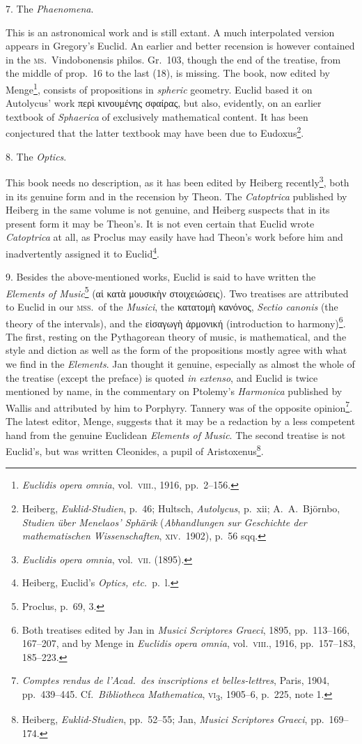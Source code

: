 7. The \emph{Phaenomena}.

This is an astronomical work and is still extant. A much interpolated version appears in Gregory's Euclid. An earlier and better recension is however contained in the \textsc{ms.}\ Vindobonensis philos. Gr.~103, though the end of the treatise, from the middle of prop.~16 to the last (18), is missing. The book, now edited by Menge\footnote{\emph{Euclidis opera omnia}, vol.~\textsc{viii}., 1916, pp.~2--156.}, consists of propositions in \emph{spheric} geometry. Euclid based it on Autolycus' work περὶ κινουμένης σφαίρας, but also, evidently, on an earlier textbook of \emph{Sphaerica} of exclusively mathematical content. It has been conjectured that the latter textbook may have been due to Eudoxus\footnote{Heiberg, \emph{Euklid-Studien}, p.~46; Hultsch, \emph{Autolycus}, p.~xii; A.~A.~Björnbo, \emph{Studien über Menelaos' Sphärik} (\emph{Abhandlungen sur Geschichte der mathematischen Wissenschaften}, \textsc{xiv.}\ 1902), p.~56 sqq.}.

8. The \emph{Optics}.

This book needs no description, as it has been edited by Heiberg recently\footnote{\emph{Euclidis opera omnia}, vol.~\textsc{vii}. (1895).}, both in its genuine form and in the recension by Theon. The \emph{Catoptrica} published by Heiberg in the same volume is not genuine, and Heiberg suspects that in its present form it may be Theon's. It is not even certain that Euclid wrote \emph{Catoptrica} at all, as Proclus may easily have had Theon's work before him and inadvertently assigned it to Euclid\footnote{Heiberg, Euclid's \emph{Optics, etc.}\ p.~l.}.

9. Besides the above-mentioned works, Euclid is said to have written the \emph{Elements of Music}\footnote{Proclus, p.~69, 3.} (αἱ κατὰ μουσικὴν στοιχειώσεις). Two treatises are attributed to Euclid in our \textsc{mss.}\ of the \emph{Musici}, the κατατομὴ κανόνος, \emph{Sectio canonis} (the theory of the intervals), and the εἰσαγωγὴ ἁρμονική (introduction to harmony)\footnote{Both treatises edited by Jan in \emph{Musici Scriptores Graeci}, 1895, pp.~113--166, 167--207, and by Menge in \emph{Euclidis opera omnia}, vol.~\textsc{viii}., 1916, pp.~157--183, 185--223.}. The first, resting on the Pythagorean theory of music, is mathematical, and the style and diction as well as the form of the propositions mostly agree with what we find in the \emph{Elements}. Jan thought it genuine, especially as almost the whole of the treatise (except the preface) is quoted \emph{in extenso}, and Euclid is twice mentioned by name, in the commentary on Ptolemy's \emph{Harmonica} published by Wallis and attributed by him to Porphyry. Tannery was of the opposite opinion\footnote{\emph{Comptes rendus de l'Acad.\ des inscriptions et belles-lettres}, Paris, 1904, pp.~439--445. Cf.\ \emph{Bibliotheca Mathematica}, \textsc{vi}\textsubscript{3}, 1905--6, p.~225, note 1.}. The latest editor, Menge, suggests that it may be a redaction by a less competent hand from the genuine Euclidean \emph{Elements of Music}. The second treatise is not Euclid's, but was written Cleonides, a pupil of Aristoxenus\footnote{Heiberg, \emph{Euklid-Studien}, pp.~52--55; Jan, \emph{Musici Scriptores Graeci}, pp.~169--174.}.

